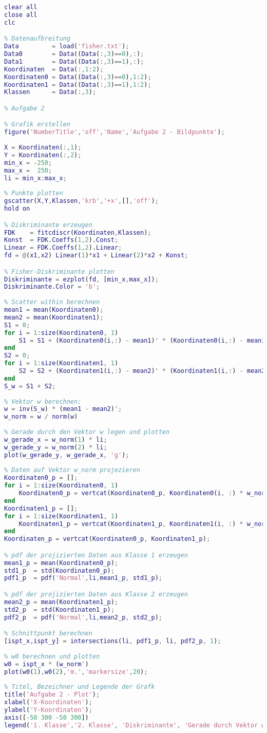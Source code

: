 \documentclass[12pt]{article}
\begin{document}
\begin{lstlisting}[language=Matlab]
% Clean up
clear all
close all
clc

% Datenaufbreitung
Data         = load('fisher.txt');
Data0        = Data((Data(:,3)==0),:);
Data1        = Data((Data(:,3)==1),:);
Koordinaten  = Data(:,1:2);
Koordinaten0 = Data((Data(:,3)==0),1:2);
Koordinaten1 = Data((Data(:,3)==1),1:2);
Klassen      = Data(:,3);

% Aufgabe 2

% Grafik erstellen
figure('NumberTitle','off','Name','Aufgabe 2 - Bildpunkte');
    
X = Koordinaten(:,1);
Y = Koordinaten(:,2);
min_x = -250;
max_x =  250;
li = min_x:max_x;
    
% Punkte plotten
gscatter(X,Y,Klassen,'krb','+x',[],'off');
hold on

% Diskriminante erzeugen
FDK    = fitcdiscr(Koordinaten,Klassen);
Konst  = FDK.Coeffs(1,2).Const;
Linear = FDK.Coeffs(1,2).Linear;
fd = @(x1,x2) Linear(1)*x1 + Linear(2)*x2 + Konst;

% Fisher-Diskriminante plotten
Diskriminante = ezplot(fd, [min_x,max_x]);
Diskriminante.Color = 'b';
    
% Scatter within berechnen
mean1 = mean(Koordinaten0);
mean2 = mean(Koordinaten1);
S1 = 0;
for i = 1:size(Koordinaten0, 1)
    S1 = S1 + (Koordinaten0(i,:) - mean1)' * (Koordinaten0(i,:) - mean1);
end
S2 = 0;
for i = 1:size(Koordinaten1, 1)
	S2 = S2 + (Koordinaten1(i,:) - mean2)' * (Koordinaten1(i,:) - mean2);
end
S_w = S1 + S2;
  
% Vektor w berechnen:
w = inv(S_w) * (mean1 - mean2)';
w_norm = w / norm(w)
    
% Gerade durch den Vektor w legen und plotten
w_gerade_x = w_norm(1) * li;
w_gerade_y = w_norm(2) * li;
plot(w_gerade_y, w_gerade_x, 'g');    
    
% Daten auf Vektor w_norm projezieren
Koordinaten0_p = [];
for i = 1:size(Koordinaten0, 1)
    Koordinaten0_p = vertcat(Koordinaten0_p, Koordinaten0(i, :) * w_norm);
end
Koordinaten1_p = [];
for i = 1:size(Koordinaten1, 1)
    Koordinaten1_p = vertcat(Koordinaten1_p, Koordinaten1(i, :) * w_norm);
end
Koordinaten_p = vertcat(Koordinaten0_p, Koordinaten1_p);

% pdf der projizierten Daten aus Klasse 1 erzeugen
mean1_p = mean(Koordinaten0_p);
std1_p  = std(Koordinaten0_p);
pdf1_p  = pdf('Normal',li,mean1_p, std1_p);

% pdf der projizierten Daten aus Klasse 2 erzeugen
mean2_p = mean(Koordinaten1_p);
std2_p  = std(Koordinaten1_p);
pdf2_p  = pdf('Normal',li,mean2_p, std2_p);

% Schnittpunkt berechnen
[ispt_x,ispt_y] = intersections(li, pdf1_p, li, pdf2_p, 1);
    
% w0 berechnen und plotten
w0 = ispt_x * (w_norm')
plot(w0(1),w0(2),'m.','markersize',20);
    
% Titel, Bezeichner und Legende der Grafk
title('Aufgabe 2 - Plot');
xlabel('X-Koordinaten');
ylabel('Y-Koordinaten');
axis([-50 300 -50 300])
legend('1. Klasse','2. Klasse', 'Diskriminante', 'Gerade durch Vektor w', 'Punkt w_0')
\end{lstlisting}
\end{document}
